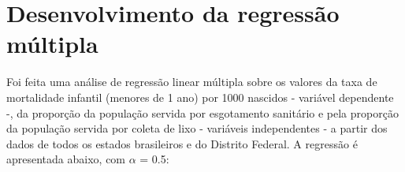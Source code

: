 \chapter{Desenvolvimento da regressão múltipla}
\label{ref:desenvolvimento}
Foi feita uma análise de regressão linear múltipla sobre os valores da taxa de mortalidade infantil (menores de 1 ano) por 1000 nascidos - variável dependente -, da proporção
da população servida por esgotamento sanitário e pela proporção da população servida por coleta de lixo - variáveis independentes - a partir dos dados de todos os estados brasileiros
e do Distrito Federal. A regressão é apresentada abaixo, com $\alpha$ = 0.5:
\begin{table}[h]
\centering
{}
\end{table}
